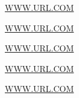 \documentclass[t]{beamer}
\begin{document}
\begin{frame}
\url{WWW.URL.COM}

\large\url{WWW.URL.COM}

\Large\url{WWW.URL.COM}

\LARGE\url{WWW.URL.COM}

\fontsize{48}{56}\selectfont\url{WWW.URL.COM}
\end{frame}
\end{document}
